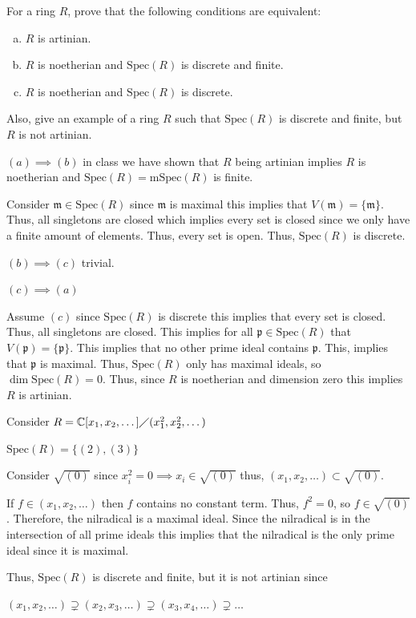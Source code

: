 \documentclass[12pt, letterpaper]{article}
\newcommand{\C}{\mathbb{C}}
\newcommand{\p}{\mathfrak{p}}
\newcommand{\Spec}{\mathrm{Spec}}
\newcommand{\mf}[1]{\mathfrak{#1}}
\begin{document}
\begin{problem}{}
    For a ring $R$, prove that the following conditions are equivalent:
    \begin{enumerate}[(a)]
        \item $R$ is artinian.
        \item $R$ is noetherian and $\Spec(R)$ is discrete and finite.
        \item $R$ is noetherian and $\Spec(R)$ is discrete.
    \end{enumerate}
    Also, give an example of a ring $R$ such that $\Spec(R)$ is discrete and finite,
but $R$ is not artinian. 
\end{problem}
\begin{problemproof}
    $(a) \implies (b)$ in class we have shown that $R$ being artinian implies $R$ is noetherian and $\Spec(R)=\mathrm{mSpec}(R)$ is finite.

    Consider $\mf{m} \in \Spec(R)$ since $\mf{m}$ is maximal this implies that $V(\mf{m})=\{\mf{m}\}$. Thus, all singletons are closed which implies every set is closed since we only have a finite amount of elements. Thus, every set is open. Thus, $\Spec(R)$ is discrete.

    $(b) \implies (c)$ trivial.

    $(c) \implies (a)$

    Assume $(c)$ since $\Spec(R)$ is discrete this implies that every set is closed. Thus, all singletons are closed. This implies for all $\p \in \Spec(R)$ that $V(\p) = \{\p\}$. This implies that no other prime ideal contains $\p$.
    This, implies that $\p$ is maximal. Thus, $\Spec(R)$ only has maximal ideals, so $\dim \Spec(R) = 0$. Thus, since $R$ is noetherian and dimension zero this implies $R$ is artinian.

    Consider $R=\C[x_1,x_2,\dots] \diagup (x_1^2,x_2^2,\dots)$

    $\Spec(R)=\{(2),(3)\}$

    Consider $\sqrt{(0)}$ since $x_i^2 = 0 \implies x_i \in \sqrt{(0)}$ thus, $(x_1,x_2,\dots) \subset \sqrt{(0)}$.

    If $f \in (x_1,x_2,\dots)$ then $f$ contains no constant term. Thus, $f^2=0$, so $f \in \sqrt{(0)}$. Therefore, the nilradical is a maximal ideal. Since the nilradical is in the intersection of all prime ideals this implies that the nilradical is the only prime ideal since it is maximal.

    Thus, $\Spec(R)$ is discrete and finite, but it is not artinian since

    $(x_1,x_2,\dots) \supsetneq (x_2,x_3,\dots) \supsetneq (x_3,x_4,\dots) \supsetneq \dots$
\end{problemproof}
\end{document}
